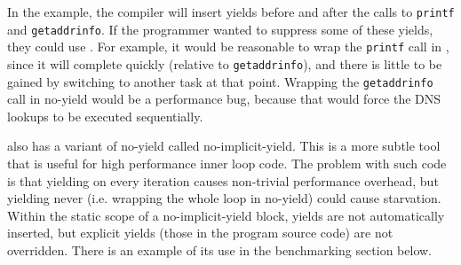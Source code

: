 \documentclass[9pt,preprint]{sigplanconf}
\begin{document}
In the example, the compiler will insert yields before and after the calls to \texttt{printf} and \texttt{getaddrinfo}.
If the programmer wanted to suppress some of these yields, they could use \noyield{}.
For example, it would be reasonable to wrap the \texttt{printf} call in \noyield{}, since it will complete quickly (relative to \texttt{getaddrinfo}), and there is little to be gained by switching to another task at that point.
Wrapping the \texttt{getaddrinfo} call in no-yield would be a performance bug, because that would force the DNS lookups to be executed sequentially.

\charcoal{} also has a variant of no-yield called no-implicit-yield.
This is a more subtle tool that is useful for high performance inner loop code.
The problem with such code is that yielding on every iteration causes non-trivial performance overhead, but yielding never (i.e. wrapping the whole loop in no-yield) could cause starvation.
Within the static scope of a no-implicit-yield block, yields are not automatically inserted, but explicit yields (those in the program source code) are not overridden.
There is an example of its use in the benchmarking section below.




\end{document}
